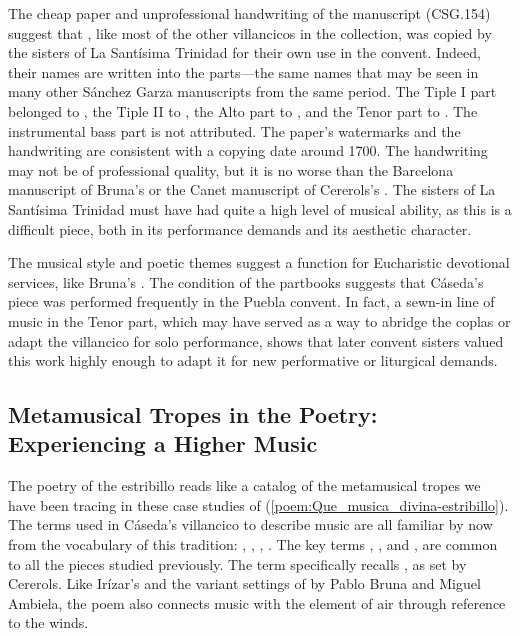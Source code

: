 The cheap paper and unprofessional handwriting of the manuscript (CSG.154) suggest that , like most of the other villancicos in the collection, was copied by the sisters of La Santísima Trinidad for their own use in the convent.
Indeed, their names are written into the parts---the same names that may be seen in many other Sánchez Garza manuscripts from the same period.
The Tiple I part belonged to , the Tiple II to , the Alto part to , and the Tenor part to .
The instrumental bass part is not attributed.
The paper's watermarks and the handwriting are consistent with a copying date around 1700.
The handwriting may not be of professional quality, but it is no worse than the Barcelona manuscript of Bruna's  or the Canet manuscript of Cererols's . 
The sisters of La Santísima Trinidad must have had quite a high level of musical ability, as this is a difficult piece, both in its performance demands and its aesthetic character. 

The musical style and poetic themes suggest a function for Eucharistic devotional services, like Bruna's .
The condition of the partbooks suggests that Cáseda's piece was performed frequently in the Puebla convent.
In fact, a sewn-in line of music in the Tenor part, which may have served as a way to abridge the coplas or adapt the villancico for solo performance, shows that later convent sisters valued this work highly enough to adapt it for new performative or liturgical demands.

\subsection{Metamusical Tropes in the Poetry: Experiencing a Higher Music}

The poetry of the estribillo reads like a catalog of the metamusical tropes we have been tracing in these case studies of  (\cref{poem:Que_musica_divina-estribillo}).
The terms used in Cáseda's villancico to describe music are all familiar by now from the vocabulary of this tradition: , , , . 
The key terms , , and , are common to all the pieces studied previously.
The term  specifically recalls , as set by Cererols. 
Like Irízar's  and the variant settings of  by Pablo Bruna and Miguel Ambiela, the poem also connects music with the element of air through reference to the winds.

